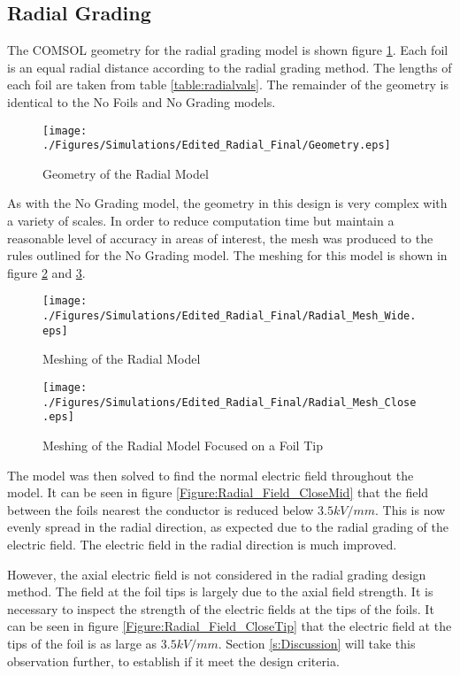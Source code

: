 \subsection{Radial Grading}
The COMSOL geometry for the radial grading model is shown figure \ref{Figure:Radial_Geom}. 
Each foil is an equal radial distance according to the radial grading method.
The lengths of each foil are taken from table \ref{table:radialvals}.
The remainder of the geometry is identical to the No Foils and No Grading models.

\begin{figure}[!h]
  \centering
    \texttt{[image: ./Figures/Simulations/Edited\_Radial\_Final/Geometry.eps]} 
	\caption{Geometry of the Radial Model}
	\label{Figure:Radial_Geom}
\end{figure}

As with the No Grading model, the geometry in this design is very complex with a variety of scales.
In order to reduce computation time but maintain a reasonable level of accuracy in areas of interest, the mesh was produced to the rules outlined for the No Grading model. The meshing for this model is shown in figure \ref{Figure:Radial_Mesh_wide} and \ref{Figure:Radial_Mesh_close}. 
\begin{figure}[!h]
  \centering
    \texttt{[image: ./Figures/Simulations/Edited\_Radial\_Final/Radial\_Mesh\_Wide.eps]} 
	\caption{Meshing of the Radial Model}
	\label{Figure:Radial_Mesh_wide}
\end{figure}

\begin{figure}[!h]
  \centering
    \texttt{[image: ./Figures/Simulations/Edited\_Radial\_Final/Radial\_Mesh\_Close.eps]} 
	\caption{Meshing of the Radial Model Focused on a Foil Tip}
	\label{Figure:Radial_Mesh_close}
\end{figure}

The model was then solved to find the normal electric field throughout the model.
It can be seen in figure \ref{Figure:Radial_Field_CloseMid} that the field between the foils nearest the conductor is reduced below $3.5kV/mm$.
This is now evenly spread in the radial direction, as expected due to the radial grading of the electric field.
The electric field in the radial direction is much improved.

However, the axial electric field is not considered in the radial grading design method.
The field at the foil tips is largely due to the axial field strength.
It is necessary to inspect the strength of the electric fields at the tips of the foils.
It can be seen in figure \ref{Figure:Radial_Field_CloseTip} that the electric field at the tips of the foil is as large as $3.5kV/mm$.
Section \ref{s:Discussion} will take this observation further, to establish if it meet the design criteria.

